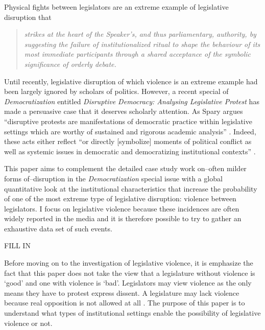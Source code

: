 \documentclass[a4paper]{article}\usepackage{graphicx, color}
\begin{document}
Physical fights between legislators are an extreme example of legislative disruption that

\begin{quote}
	\emph{strikes at the heart of the Speaker's, and thus parliamentary, authority, by suggesting the failure of institutionalized ritual to shape the behaviour of its most immediate participants through a shared acceptance of the symbolic significance of orderly debate.} \citep[387]{Rai2013}
\end{quote}

\noindent Until recently, legislative disruption of which violence is an extreme example had been largely ignored by scholars of politics. However, a recent special of \emph{Democratization} \citeyearpar{Democratization2013} entitled \emph{Disruptive Democracy: Analysing Legislative Protest} has made a persuasive case that it deserves scholarly attention. As Spary argues ``disruptive protests are manifestations of democratic practice within legislative settings which are worthy of sustained and rigorous academic analysis'' \citeyearpar[393]{Spary2013}. Indeed, these acts either reflect ``or directly [symbolize] moments of political conflict as well as systemic issues in democratic and democratizing institutional contexts'' \citep[394-395]{Spary2013}.

This paper aims to complement the detailed case study work on--often milder forms of--disruption in the \emph{Democratization} special issue \citep{Armitage2013,Johnson2013,Ilie2013} with a global quantitative look at the institutional characteristics that increase the probability of one of the most extreme type of legislative disruption: violence between legislators. I focus on legislative violence because these incidences are often widely reported in the media and it is therefore possible to try to gather an exhaustive data set of such events. 

FILL IN

Before moving on to the investigation of legislative violence, it is emphasize the fact that this paper does not take the view that a legislature without violence is `good' and one with violence is `bad'. Legislators may view violence as the only means they have to protest express dissent. A legislature may lack violence because real opposition is not allowed at all \citep[for a discussion in the Russian context see][]{Ostrow1996}. The purpose of this paper is to understand what types of institutional settings enable the possibility of legislative violence or not.



\end{document}
